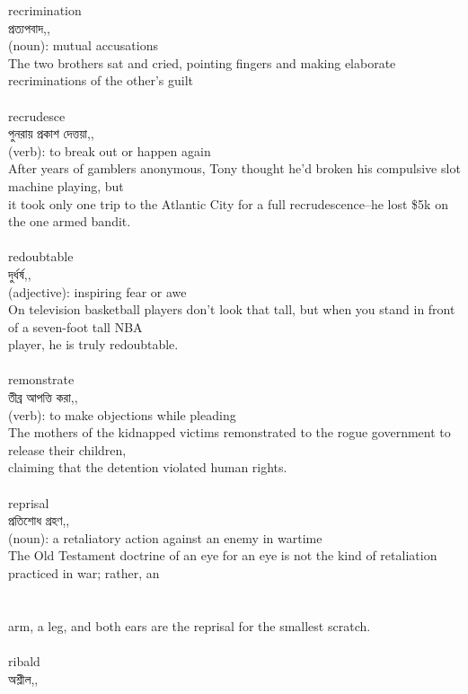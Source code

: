 \documentclass{article}
\begin{document}
{{recrimination}\\
{প্রত্যপবাদ,,}\\
{(noun): mutual accusations\\The two brothers sat and cried, pointing fingers and making elaborate recriminations of the other's guilt\\}\\
{recrudesce}\\
{পুনরায় প্রকাশ দেত্তয়া,,}\\
{(verb): to break out or happen again\\After years of gamblers anonymous, Tony thought he'd broken his compulsive slot machine playing, but\\it took only one trip to the Atlantic City for a full recrudescence--he lost \$5k on the one armed bandit.\\}\\
{redoubtable}\\
{দুর্ধর্ষ,,}\\
{(adjective): inspiring fear or awe\\On television basketball players don't look that tall, but when you stand in front of a seven-foot tall NBA\\player, he is truly redoubtable.\\}\\
{remonstrate}\\
{তীব্র আপত্তি করা,,}\\
{(verb): to make objections while pleading\\The mothers of the kidnapped victims remonstrated to the rogue government to release their children,\\claiming that the detention violated human rights.\\}\\
{reprisal}\\
{প্রতিশোধ গ্রহণ,,}\\
{(noun): a retaliatory action against an enemy in wartime\\The Old Testament doctrine of an eye for an eye is not the kind of retaliation practiced in war; rather, an\\\\                                                                               \\arm, a leg, and both ears are the reprisal for the smallest scratch.\\}\\
{ribald}\\
{অশ্লীল,,}\\
}
\end{document}
